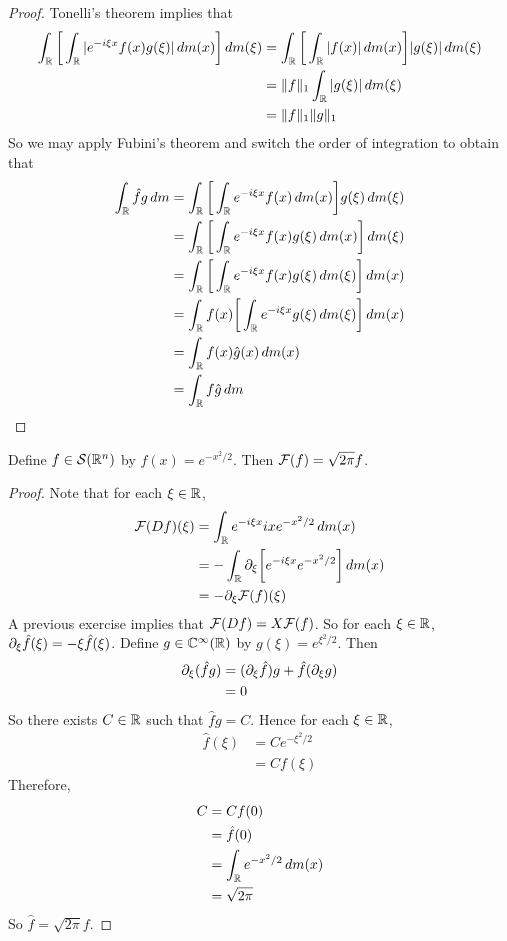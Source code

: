 \documentclass{book}
\begin{document}
	\begin{proof}
		Tonelli's theorem implies that  
		\begin{align*}
			\int_{\mathbb{R}} \bigg[ \int_{\mathbb{R}}|e^{-i \xi x} f(x) g(\xi)| \, d m(x) \bigg] \, d m(\xi)
			& = \int_{\mathbb{R}} \bigg[ \int_{\mathbb{R}}|f(x)| \, d m(x) \bigg]  |g(\xi)| \, d m(\xi) \\
			& = \|f\|_1 \int_{\mathbb{R}}  |g(\xi)| \, d m(\xi) \\
			& = \|f\|_1\|g\|_1
		\end{align*}  
		So we may apply Fubini's theorem and switch the order of integration to obtain that
		\begin{align*}
			\int_{\mathbb{R}}\hat{f} g \, d m 
			& = \int_{\mathbb{R}} \bigg[ \int_{\mathbb{R}}e^{-i \xi x} f(x) \, d m(x) \bigg]  g(\xi) \, d m(\xi) \\
			& = \int_{\mathbb{R}} \bigg[ \int_{\mathbb{R}}e^{-i \xi x} f(x) g(\xi) \, d m(x) \bigg] \, d m(\xi) \\
			& = \int_{\mathbb{R}} \bigg[ \int_{\mathbb{R}}e^{-i \xi x} f(x) g(\xi) \, d m(\xi) \bigg] \, d m(x) \\
			& = \int_{\mathbb{R}} f(x) \bigg[ \int_{\mathbb{R}}e^{-i \xi x}  g(\xi) \, d m(\xi) \bigg] \, d m(x) \\
			& = \int_{\mathbb{R}} f(x) \hat{g}(x) \, d m(x) \\
			& = \int_{\mathbb{R}} f \hat{g} \, d m \\
		\end{align*}
	\end{proof}


	\begin{ex}
		Define $f \in \mathcal{S}(\mathbb{R}^n)$ by $f(x) = e^{-x^2/2}$. Then $\mathcal{F}(f) = \sqrt{2 \pi}f$.
	\end{ex}

	\begin{proof}
		Note that for each $\xi \in \mathbb{R}$, 
		\begin{align*}
			\mathcal{F}(Df)(\xi) 
			& = \int_{\mathbb{R}} e^{-i \xi x}ixe^{-x^2/2} \, d m(x) \\
			& = -\int_{\mathbb{R}}  \partial_{\xi} \bigg[ e^{-i \xi x} e^{-x^2/2}\bigg] \, d m(x) \\
			& = - \partial_{\xi} \mathcal{F}(f)(\xi) 
		\end{align*}
		A previous exercise implies that $\mathcal{F}(Df) = X \mathcal{F}(f)$. So for each $\xi \in \mathbb{R}$, $\partial_{\xi} \hat{f}(\xi) = - \xi \hat{f}(\xi)$. Define $g \in \mathbb{C}^{\infty}(\mathbb{R})$ by $g(\xi) = e^{\xi^2/2}$. Then 
		\begin{align*}
			\partial_{\xi} (\hat{f} g) 
			& = (\partial_{\xi} \hat{f}) g + \hat{f} (\partial_{\xi}g) \\
			& = 0
		\end{align*}
		So there exists $C \in \mathbb{R}$ such that $\hat{f}g = C$. Hence for each $\xi \in \mathbb{R}$, 
		\begin{align*}
			\hat{f}(\xi) 
			& = Ce^{-\xi^2/2} \\
			& = Cf(\xi)
		\end{align*}
		Therefore, 
		\begin{align*}
			C
			& = Cf(0) \\
			& = \hat{f}(0) \\
			& = \int_{\mathbb{R}} e^{-x^2/2} \, d m(x) \\
			& = \sqrt{2 \pi} 
		\end{align*}
		So $\hat{f} = \sqrt{2 \pi}f$.
	\end{proof}
\end{document}

